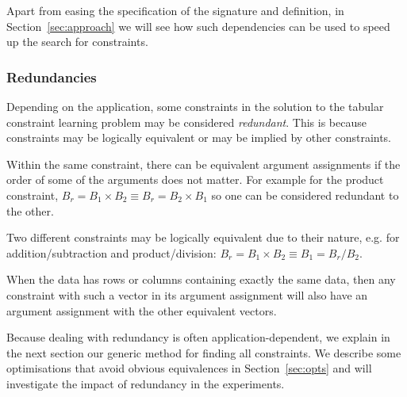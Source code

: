 \documentclass{IEEEtran}
\newcommand{\eccalc}[2]{\ensuremath{#1 = #2}}
\newcommand{\ecprod}[3]{\eccalc{#1}{#2 \times #3}}
\newcommand{\ecdiv}[3]{\eccalc{#1}{{#2} / {#3}}}
\newcommand{\sg}{B}
\theoremstyle{definition}
\begin{document}
Apart from easing the specification of the signature and definition, in Section~\ref{sec:approach} we will see how such dependencies can be used to speed up the search for constraints.

\subsubsection{Redundancies}
\label{sec:form:redundancies}
Depending on the application, some constraints in the solution to the tabular constraint learning problem may be considered \textit{redundant}. This is because constraints may be logically equivalent or may be implied by other constraints.

Within the same constraint, there can be equivalent argument assignments if the order of some of the arguments does not matter. For example for the product constraint, $\ecprod{\sg_r}{\sg_1}{\sg_2} \equiv \ecprod{\sg_r}{\sg_2}{\sg_1}$ so one can be considered redundant to the other.

Two different constraints may be logically equivalent due to their nature, e.g. for addition/subtraction and product/division: $\ecprod{\sg_r}{\sg_1}{\sg_2} \equiv \ecdiv{\sg_1}{\sg_r}{\sg_2}$.

When the data has rows or columns containing exactly the same data, then any constraint with such a vector in its argument assignment will also have an argument assignment with the other equivalent vectors.

Because dealing with redundancy is often application-dependent, we explain in the next section our generic method for finding all constraints. We describe some optimisations that avoid obvious equivalences in Section~\ref{sec:opts} and will investigate the impact of redundancy in the experiments.
\end{document}
